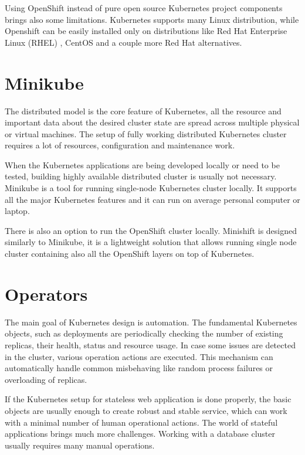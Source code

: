 \documentclass[
  digital, %
  twoside, %
  table,   %
  lof,     %
  lot,     %
]{fithesis3}
\begin{document}
Using OpenShift instead of pure open source Kubernetes project components brings also some limitations. Kubernetes supports many Linux distribution, while Openshift can be easily installed only on distributions like Red Hat Enterprise Linux (RHEL) \cite{rhel}, CentOS \cite{centos} and a couple more Red Hat alternatives.

\section{Minikube} \label{sec:minikube}
The distributed model is the core feature of Kubernetes, all the resource and important data about the desired cluster state are spread across multiple physical or virtual machines. The setup of fully working distributed Kubernetes cluster requires a lot of resources, configuration and maintenance work.

When the Kubernetes applications are being developed locally or need to be tested, building highly available distributed cluster is usually not necessary. Minikube \cite{minikube} is a tool for running single-node Kubernetes cluster locally. It supports all the major Kubernetes features and it can run on average personal computer or laptop.

There is also an option to run the OpenShift cluster locally. Minishift \cite{minishift} is designed similarly to Minikube, it is a lightweight solution that allows running single node cluster containing also all the OpenShift layers on top of Kubernetes.

\section{Operators} \label{sec:operators}
The main goal of Kubernetes design is automation. The fundamental Kubernetes objects, such as deployments are periodically checking the number of existing replicas, their health, status and resource usage. In case some issues are detected in the cluster, various operation actions are executed. This mechanism can automatically handle common misbehaving like random process failures or overloading of replicas.

If the Kubernetes setup for stateless web application is done properly, the basic objects are usually enough to create robust and stable service, which can work with a minimal number of human operational actions. The world of stateful applications brings much more challenges. Working with a database cluster usually requires many manual operations.
\end{document}
